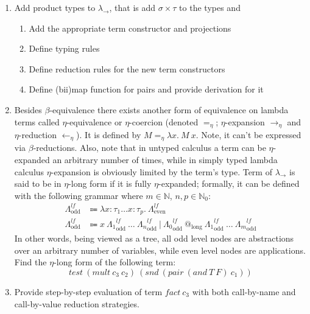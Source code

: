\documentclass[9pt]{article}
\begin{document}
\begin{enumerate}
    \item Add product types to $\lambda_{\to}$, that is add $\sigma \times \tau$ to the types and
          \begin{enumerate}
              \item Add the appropriate term constructor and projections
              \item Define typing rules
              \item Define reduction rules for the new term constructors
              \item Define (bii)map function for pairs and provide derivation for it
          \end{enumerate}
    \item Besides $\beta$-equivalence there exists another form of equivalence on lambda terms called $\eta$-equivalence or $\eta$-coercion (denoted $=_{\eta}$; $\eta$-expansion $\to_{\eta}$ and $\eta$-reduction $\leftarrow_{\eta}$).
          It is defined by $M =_{\eta} \lambda x.\ M\ x$.
          Note, it can't be expressed via $\beta$-reductions.
          Also, note that in untyped calculus a term can be $\eta$-expanded an arbitrary number of times,
          while in simply typed lambda calculus $\eta$-expansion is obviously limited by the term's type.
          Term of $\lambda_{\to}$ is said to be in $\eta$-long form if it is fully $\eta$-expanded;
          formally, it can be defined with the following grammar where $m \in \mathbb{N}$, $n,p\in\mathbb{N}_{0}$:
          \[
              \begin{array}{ll}
                  \Lambda^{lf}_{\text{odd}} & \Coloneqq \lambda x:\tau_1 \dots x:\tau_p.\ \Lambda^{lf}_{\text{even}}                                                                                                                                   \\
                  \Lambda^{lf}_{\text{odd}} & \Coloneqq x\ {\Lambda_1}^{lf}_{\text{odd}}\ \dots\ {\Lambda_n}^{lf}_{\text{odd}}\ |\ {\Lambda_0}^{lf}_{\text{odd}}\ @_{\text{long}}\ {\Lambda_1}^{lf}_{\text{odd}}\ \dots\ {\Lambda_m}^{lf}_{\text{odd}}
              \end{array}
          \]
          In other words, being viewed as a tree, all odd level nodes are abstractions over an arbitrary number of variables,
          while even level nodes are applications.
          Find the $\eta$-long form of the following term:
          $$test\ (mult\ c_3\ c_2)\ (snd\ (pair\ (and\ T\ F)\ c_1))$$
    \item Provide step-by-step evaluation of term $fact\ c_3$ with both call-by-name and call-by-value reduction strategies.
\end{enumerate}
\end{document}
